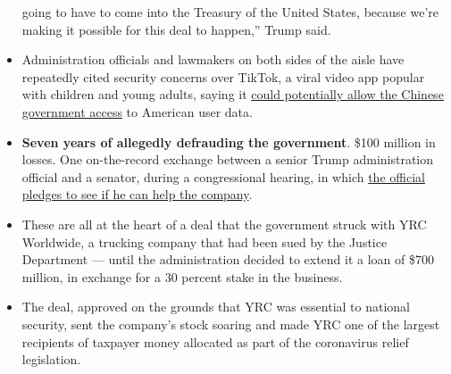\begin{itemize}
  going to have to come into the Treasury of the United States, because
  we're making it possible for this deal to happen,'' Trump said.
\item
  Administration officials and lawmakers on both sides of the aisle have
  repeatedly cited security concerns over TikTok, a viral video app
  popular with children and young adults, saying it
  \href{https://www.nytimes3xbfgragh.onion/2020/08/03/technology/tiktok-microsoft-tweens.html}{could
  potentially allow the Chinese government access} to American user
  data.
\item
  \textbf{Seven years of allegedly defrauding the government}. \$100
  million in losses. One on-the-record exchange between a senior Trump
  administration official and a senator, during a congressional hearing,
  in which
  \href{https://www.nytimes3xbfgragh.onion/2020/08/03/us/politics/yrc-coronavirus-relief-funds.html}{the
  official pledges to see if he can help the company}.
\item
  These are all at the heart of a deal that the government struck with
  YRC Worldwide, a trucking company that had been sued by the Justice
  Department --- until the administration decided to extend it a loan of
  \$700 million, in exchange for a 30 percent stake in the business.
\item
  The deal, approved on the grounds that YRC was essential to national
  security, sent the company's stock soaring and made YRC one of the
  largest recipients of taxpayer money allocated as part of the
  coronavirus relief legislation.
\end{itemize}

